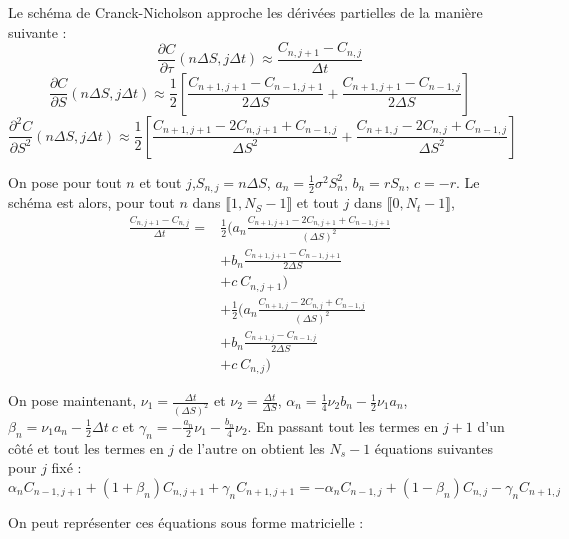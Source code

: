 \documentclass[11pt,a4paper]{article}
\begin{document}
Le schéma de Cranck-Nicholson approche les dérivées partielles de la manière suivante :
\[\frac{\partial C}{\partial \tau}(n\Delta S, j\Delta t) \approx \frac{C_{n, j + 1} - C_{n, j}}{\Delta t}\]
\[\frac{\partial C}{\partial S}(n\Delta S, j\Delta t) \approx \frac{1}{2} [\frac{C_{n+1, j+1} - C_{n-1, j+1}}{2\Delta S} + \frac{C_{n+1, j+1} - C_{n-1, j}}{2 \Delta S}]\]
\[\frac{\partial^2 C}{\partial S^2}(n\Delta S, j\Delta t) \approx \frac{1}{2} [\frac{C_{n+1, j+1} - 2C_{n,j+1} + C_{n-1,j}}{\Delta S^2} + \frac{C_{n+1, j} - 2 C_{n,j} + C_{n-1,j}}{\Delta S^2}]\]

On pose pour tout $n$ et tout $j$,$S_{n,j} = n \Delta S $, $a_{n} = \frac{1}{2} \sigma^2 S_{n}^2$, $b_{n} = r S_{n}$, $c = -r$. Le schéma est alors, pour tout $n$ dans $\llbracket 1, N_{S} - 1 \rrbracket$ et tout $j$ dans $\llbracket 0, N_{t} - 1 \rrbracket$,
\begin{equation}
\begin{split}
\frac{C_{n, j + 1} - C_{n, j}}{\Delta t} =& \frac{1}{2} (a_{n} \frac{C_{n+1,j+1} - 2 C_{n,j+1} + C_{n-1,j+1}}{(\Delta S)^2} \\
&+ b_{n} \frac{C_{n+1, j+1} - C_{n-1,j+1}}{2\Delta S} \\
&+ c ~C_{n,j+1}) \\
&+ \frac{1}{2} (a_{n} \frac{C_{n+1,j} - 2 C_{n,j} + C_{n-1,j}}{(\Delta S)^2} \\
&+ b_{n} \frac{C_{n+1, j} - C_{n-1,j}}{2\Delta S} \\
&+ c ~C_{n,j})
\end{split}
\end{equation}

On pose maintenant, $\nu_1 = \frac{\Delta t}{(\Delta S)^2}$ et $\nu_2 = \frac{\Delta t}{\Delta S}$, $\alpha_{n} = \frac{1}{4} \nu_2 b_{n} - \frac{1}{2} \nu_1 a_{n}$, $\beta_{n} = \nu_1 a_{n} - \frac{1}{2} \Delta t ~c$ et $\gamma_{n} = -\frac{a_{n}}{2}\nu_1 - \frac{b_n}{4}\nu_2$. En passant tout les termes en $j+1$ d'un côté et tout les termes en $j$ de l'autre on obtient les $N_s - 1$ équations suivantes pour $j$ fixé :
\[
\alpha_n C_{n-1,j+1} + (1 + \beta_n)C_{n,j+1} + \gamma_{n}C_{n+1,j+1} =
- \alpha_n C_{n-1,j} + (1 - \beta_n)C_{n,j} - \gamma_n C_{n+1, j}
\]

On peut représenter ces équations sous forme matricielle : \\
\end{document}
